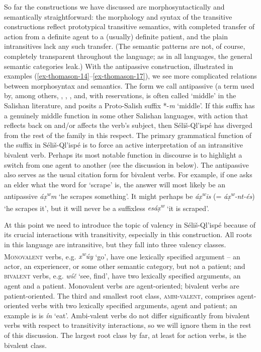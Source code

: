 \documentclass[output=paper,colorlinks,citecolor=brown]{langscibook}
\begin{document}
So far the constructions we have discussed are morphosyntactically and
semantically straightforward: the morphology and syntax of the
transitive constructions reflect prototypical transitive semantics,
with completed transfer of action from a definite agent to a (usually)
definite patient, and the plain intransitives lack any such transfer.
(The semantic patterns are not, of course, completely transparent
throughout the language; as in all languages, the general semantic
categories leak.)  With the antipassive construction, illustrated in
examples (\ref{ex-thomason-14}--\ref{ex-thomason-17}), we see more complicated relations between morphosyntax and
semantics.  The form we call antipassive (a term used by, among
others, \citet[31]{Kroeber:1999}, \citet{Darnell:1990}, \citet{Gerdts:1993}, and,
with reservations, \citet[102]{Thompson&Thompson:1992} is often
called `middle' in the Salishan literature, and \citet[158]{Newman:1980}
posits a Proto-Salish suffix *-\emph{m} `middle'.  If this suffix has a
genuinely middle function in some other Salishan languages, with
action that reflects back on and/or affects the verb's subject, then
S\'eli\v{s}-Ql'isp\'e has diverged from the rest of the family in this
respect.  The primary grammatical function of the suffix in
S\'eli\v{s}-Ql'isp\'e is to force an active interpretation of an
intransitive bivalent verb.  Perhaps its most notable function in
discourse is to highlight a switch from one agent to another (see the
discussion in  below).  The antipassive also serves as the usual
citation form for bivalent verbs.  For example, if one asks an elder
what the word for `scrape' is, the answer will most likely be an
antipassive \emph{\textglotstop\'a{\d{x}\textsuperscript w}m} `he
scrapes something'.  It might perhaps be \emph{\textglotstop\'a{\d{x}\textsuperscript w}is} (= \emph{\textglotstop\'a{\d{x}\textsuperscript w}-nt-\'es}) `he scrapes it',
but it will never be a suffixless \emph{es\textglotstop\'a\d{x}\textsuperscript w} `it is scraped'.

At this point we need to introduce the topic of valency in
S\'eli\v{s}-Ql'isp\'e because of its crucial interactions with
transitivity, especially in this construction.  All roots in this
language are intransitive, but they fall into three valency
classes. \textsc{Monovalent} verbs, e.g. \emph{x\textsuperscript w\'uy}
`go', have one lexically specified argument -- an actor, an
experiencer, or some other semantic category, but not a patient; and
\textsc{bivalent} verbs, e.g. \emph{w\'i\v{c}} `see, find', have two
lexically specified arguments, an agent and a patient.  Monovalent
verbs are agent-oriented; bivalent verbs are patient-oriented.  The
third and smallest root class, \textsc{ambi-valent}, comprises
agent\hyp oriented verbs with two lexically specified arguments, agent and
patient; an example is is \emph{\textglotstop\'i{\textltilde}n} `eat'.
Ambi-valent verbs do not differ significantly from bivalent verbs with
respect to transitivity interactions, so we will ignore them in the
rest of this discussion.  The largest root class by far, at least for
action verbs, is the bivalent class.
\end{document}
